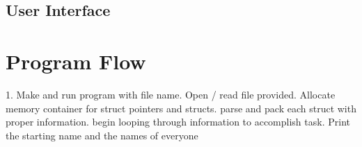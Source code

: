 \documentclass[12pt]{article}
\begin{document}
\subsection{User Interface}

\section{Program Flow}\label{Program Flow}
1. Make and run program with file name. Open / read file provided. Allocate memory container for struct pointers and structs. parse and pack each struct with proper information. begin looping through information to accomplish task. Print the starting name and the names of everyone
\end{document}
